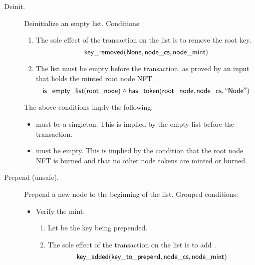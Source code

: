 \documentclass[../midgard.tex]{subfiles}
\begin{document}
\begin{description}
        \initSpendingValidatorWarning
    \item[Deinit.] Deinitialize an empty list.
      Conditions:
        \begin{enumerate}
            \item The sole effect of the transaction on the list is to remove the root key.
                \begin{equation*}
                    \mathsf{key\_removed}(\mathsf{None}, \mathsf{node\_cs}, \mathsf{node\_mint})
                \end{equation*}
            
            \item The list must be empty before the transaction, as proved by an input  that holds the minted root node NFT.
                \begin{equation*}
                    \mathsf{is\_empty\_list}(\mathsf{root\_node}) \land
                    \mathsf{has\_token}(\mathsf{root\_node}, \mathsf{node\_cs}, \mathsf{``Node''})
                \end{equation*}
        \end{enumerate}
        The above conditions imply the following:
        \begin{itemize}
            \item {} must be a singleton.
              This is implied by the empty list before the transaction.
            \item {} must be empty.
              This is implied by the condition that the root node NFT is burned and that no other node tokens are minted or burned.
        \end{itemize}

    \item[Prepend (unsafe).] Prepend a new node to the beginning of the list.
      Grouped conditions:
        \begin{itemize}
            \item Verify the mint: 
            \begin{enumerate}
                \item Let  be the key being prepended.
                \item The sole effect of the transaction on the list is to add .
                    \begin{equation*}
                        \mathsf{key\_added}(\mathsf{key\_to\_prepend}, \mathsf{node\_cs}, \mathsf{node\_mint})
                    \end{equation*}
            \end{enumerate}
            

\end{itemize}
\end{description}
\end{document}
